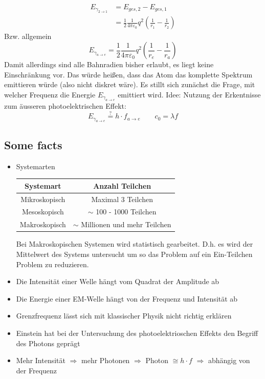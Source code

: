 \documentclass[12pt,a4paper]{report}%
\numberwithin{equation}{section}
\numberwithin{equation}{subsection}
\begin{document}
    \begin{align}
      E_{\gamma_{2\rightarrow 1}} &= E_{ges,2} - E_{ges,1} \nonumber \\
      &=  \frac{1}{2} \frac{1}{4 \pi \varepsilon_0} q^2 \left( \frac{1}{r_1} - \frac{1}{r_2}\right) \label{eq:bohr_energie_a}
    \end{align}    		
    Bzw. allgemein
    \begin{equation}
      E_{\gamma_{a \rightarrow e}} = \frac{1}{2} \frac{1}{4 \pi \varepsilon_0} q^2 \left( \frac{1}{r_e} - \frac{1}{r_a}\right)
    \end{equation}
    Damit allerdings sind alle Bahnradien bisher erlaubt, es liegt keine Einschränkung vor. Das würde heißen, dass das Atom das komplette Spektrum emittieren würde (also nicht diskret wäre). Es stillt sich zunächst die Frage, mit welcher Frequenz die Energie $E_{\gamma_{a \rightarrow e}}$ emittiert wird.\newline
    Idee: Nutzung der Erkentnisse zum äusseren photoelektrischen Effekt:
    \begin{equation}
      E_{\gamma_{a \rightarrow e}} \overset{?}{=} h \cdot f_{a \rightarrow e} \qquad c_0 = \lambda f \label{eq:bohr_energie_b}
    \end{equation}
		
		\subsection{Some facts}
		\begin{itemize}
		\item Systemarten
			\begin{table}[H]
				\centering
				\begin{tabular}{c c}
					Systemart & Anzahl Teilchen \\ \hline
					Mikroskopisch & Maximal 3 Teilchen \\
					Mesoskopisch & $\sim$ 100 - 1000 Teilchen\\
					Makroskopisch & $\sim$ Millionen und mehr Teilchen
				\end{tabular}
			\end{table}
			\vspace{-0.5cm}
			Bei Makroskopischen Systemen wird statistisch gearbeitet. D.h. es wird der Mittelwert des Systems untersucht um so das Problem auf ein Ein-Teilchen Problem zu reduzieren.
		\item Die Intensität einer Welle hängt vom Quadrat der Amplitude ab
		\item Die Energie einer EM-Welle hängt von der Frequenz und Intensität ab
		\item Grenzfrequenz lässt sich mit klassischer Physik nicht richtig erklären
		\item Einstein hat bei der Untersuchung des photoelektrioschen Effekts den Begriff des Photons geprägt
		\item Mehr Intensität $\Rightarrow$ mehr Photonen $\Rightarrow$ Photon $\cong h \cdot f$ $\Rightarrow$ abhängig von der Frequenz
		\end{itemize}
\newpage
\end{document}
